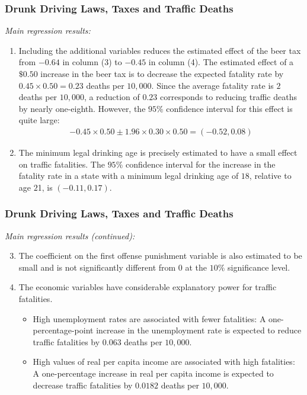\begin{frame}
\frametitle{Drunk Driving Laws, Taxes and Traffic Deaths}
\emph{Main regression results:}
\begin{enumerate}
\item Including the additional variables reduces the estimated effect of the beer tax from $-0.64$ in column (3) to $-0.45$ in column (4). The estimated effect of a $\$0.50$ increase in the beer tax is to decrease the expected fatality rate by $0.45 \times 0.50 = 0.23$ deaths per $10,000$. Since the average fatality rate is $2$ deaths per $10,000$, a reduction of $0.23$ corresponds to reducing traffic deaths by nearly one-eighth.
However, the $95\%$ confidence interval for this effect is quite large:
\begin{align*}
-0.45 \times 0.50 \pm 1.96 \times 0.30 \times 0.50 = (-0.52, 0.08)
\end{align*}
\item The minimum legal drinking age is precisely estimated to have a small effect on traffic fatalities. The $95\%$ confidence interval for the increase in the fatality rate in a state with a minimum legal drinking age of $18$, relative to age $2$1, is $(-0.11, 0.17)$. 
\end{enumerate}
\end{frame}


\begin{frame}
\frametitle{Drunk Driving Laws, Taxes and Traffic Deaths}
\emph{Main regression results (continued):}
\begin{enumerate}\setcounter{enumi}{2}
\item The coefficient on the first offense punishment variable is also estimated to be small and is not significantly different from $0$ at the $10\%$ significance level.
\item The economic variables have considerable explanatory power for traffic fatalities. 
\begin{itemize}
\item 
High unemployment rates are associated with fewer fatalities: 
\smallskip\newline\quad
A  one-percentage-point increase in the unemployment rate is expected to reduce traffic fatalities by $0.063$ deaths per $10,000$.
\smallskip
\item
High values of real per capita income are associated with high fatalities: 
\smallskip\newline\quad
A one-percentage increase in real per capita income is expected to decrease traffic fatalities by $0.0182$ deaths per $10,000$.
\end{itemize}
\end{enumerate}
\end{frame}


